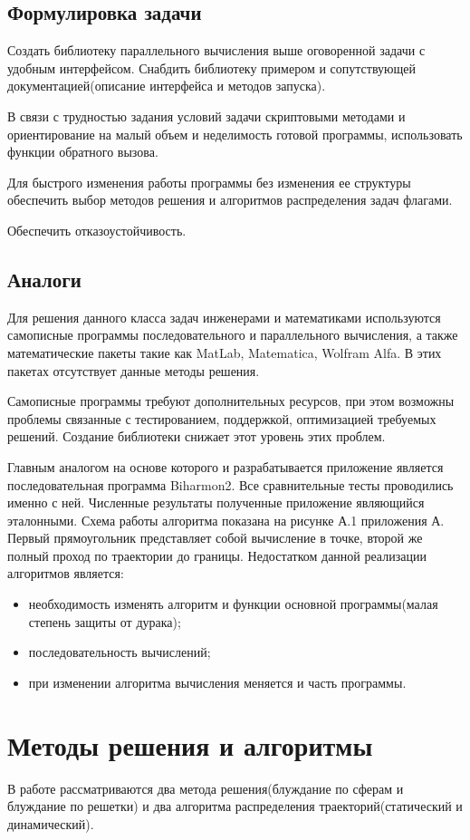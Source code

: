 \section{Формулировка задачи}
Создать библиотеку параллельного вычисления выше оговоренной задачи с удобным интерфейсом. Снабдить библиотеку примером и сопутствующей документацией(описание интерфейса и методов запуска).

В связи с трудностью задания условий задачи скриптовыми методами и ориентирование на малый объем и неделимость готовой программы, использовать функции обратного вызова.

Для быстрого изменения работы программы без изменения ее структуры обеспечить выбор методов решения и алгоритмов распределения задач флагами.

Обеспечить отказоустойчивость.
\section{Аналоги}
Для решения данного класса задач инженерами и математиками используются самописные программы последовательного и параллельного вычисления, а также математические пакеты такие как MatLab, Matematica, Wolfram Alfa. В этих пакетах отсутствует данные методы решения.

Самописные программы требуют дополнительных ресурсов, при этом возможны проблемы связанные с тестированием, поддержкой, оптимизацией требуемых решений.
Создание библиотеки снижает этот уровень этих проблем.

Главным аналогом на основе которого и разрабатывается приложение является последовательная программа Biharmon2. 
Все сравнительные тесты проводились именно с ней. Численные результаты полученные приложение являющийся эталонными.
Схема работы алгоритма показана на рисунке А.1 приложения А. Первый прямоугольник представляет собой вычисление в точке, второй же полный проход по траектории до границы. Недостатком данной реализации алгоритмов является:
\begin{itemize}
	\item необходимость изменять алгоритм и функции основной программы(малая степень защиты от дурака);
	\item последовательность вычислений;
	\item при изменении алгоритма вычисления меняется и часть программы.
\end{itemize}
\chapter{Методы решения и алгоритмы}
В работе рассматриваются два метода решения(блуждание по сферам и блуждание по решетки) и два алгоритма распределения траекторий(статический и динамический).

